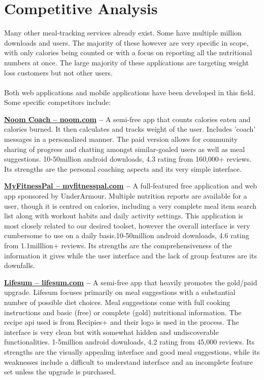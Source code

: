 \documentclass[a4paper,12pt]{article}
\begin{document}
\section{Competitive Analysis}
Many other meal-tracking services already exist.  Some have multiple million downloads and users.  The majority of these however are very specific in scope, with only calories being counted or with a focus on reporting all the nutritional numbers at once.  The large majority of these applications are targeting weight loss customers but not other users.\\
\\
Both web applications and mobile applications have been developed in this field.  Some specific competitors include: \begin{list}{•}{•}
\item \textbf{\href{http://www.noom.com}{Noom Coach -- noom.com} -- }A semi-free app that counts calories eaten and calories burned.  It then calculates and tracks weight of the user.  Includes 'coach' messages in a personalized manner.  The paid version allows for community sharing of progress and chatting amongst similar-goaled users as well as meal suggestions.  10-50million android downloads, 4.3 rating from 160,000+ reviews.  Its strengths are the personal coaching aspects and its very simple interface.
\item \textbf{\href{http://www.myfitnesspal.com}{MyFitnessPal -- myfitnesspal.com} -- }A full-featured free application and web app sponsored by UnderArmour.  Multiple nutrition reports are available for a user, though it is centred on calories, including a very complete meal item search list along with workout habits and daily activity settings.  This application is most closely related to our desired toolset, however the overall interface is very cumbersome to use on a daily basis.10-50million android downloads, 4.6 rating from 1.1milllion+ reviews.  Its strengths are the comprehensiveness of the information it gives while the user interface and the lack of group features are its downfalls.
\item \textbf{\href{http://www.lifesum.com}{Lifesum -- lifesum.com} -- }A semi-free app that heavily promotes the gold/paid upgrade.  Lifesum focuses primarily on meal suggestions with a substantial number of possible diet choices.  Meal suggestions come with full cooking instructions and basic (free) or complete (gold) nutritional information.  The recipe api used is from Recipies+ and their logo is used in the process.  The interface is very clean but with somewhat hidden and undiscoverable functionalities.  1-5million android downloads, 4.2 rating from 45,000 reviews.  Its strengths are the visually appealing interface and good meal suggestions, while its weaknesses include a difficult to understand interface and an incomplete feature set unless the upgrade is purchased.

\end{list}
\end{document}
